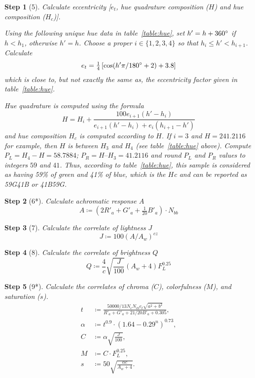 \documentclass[twocolumn]{scrartcl}
\theoremstyle{named}
\newtheorem*{step}{Step}
\begin{document}
\begin{step}[5]
Calculate eccentricity [$e_t$, hue quadrature composition
($H$) and hue composition ($H_c$)].

Using the following unique hue data in table~\ref{table:hue}, set
$h'= h + 360\degree$ if $h < h_1$, otherwise $h'=h$.
Choose a proper $i\in\{1,2,3,4\}$ so that $h_i\le h' < h_{i+1}$.
Calculate
\[
  e_t = \tfrac{1}{4}
  \left[
    \cos(h'\pi/180\degree + 2) + 3.8
  \right]
\]
which is close to, but not exactly the same as, the eccentricity factor given
in table~\ref{table:hue}.

Hue quadrature is computed using the formula
\[
  H = H_i + \frac{100 e_{i+1} (h'-h_i)}{e_{i+1}(h'-h_i) + e_i (h_{i+1}-h')}
\]
and hue composition $H_c$ is computed according to $H$.  If $i=3$ and $H =
241.2116$ for example, then $H$ is between $H_3$ and $H_4$ (see
table~\ref{table:hue} above). Compute $P_L=H_4-H = 58.7884$; $P_R = H – H_3 =
41.2116$ and round $P_L$ and $P_R$ values to integers $59$ and $41$. Thus,
according to table~\ref{table:hue}, this sample is considered as having 59\%
of green and 41\% of blue, which is the $H$c and can be reported as 59G41B or
41B59G.
\end{step}

\begin{step}[6*]
Calculate achromatic response $A$
\[
  A\coloneqq (2 R'_a + G'_a + \tfrac{1}{20} B'_a) \cdot N_{bb}
  \]
\end{step}

\begin{step}[7]
Calculate the correlate of lightness $J$
\[
  J \coloneqq 100 {(A / A_w)}^{cz}
  \]
\end{step}

\begin{step}[8]
  Calculate the correlate of brightness $Q$
  \[
    Q \coloneqq \frac{4}{c} \sqrt{\frac{J}{100}} (A_w+4) F_L^{0.25}
    \]
\end{step}

\begin{step}[9*]
Calculate the correlates of chroma ($C$), colorfulness ($M$), and saturation
  ($s$).
\begin{align*}
  t&\coloneqq \frac{50000/13 N_c N_{cb} e_t \sqrt{a^2 + b^2}}{R'_a + G'_a + 21/20 B'_a + 0.305},\\
  \alpha&\coloneqq t^{0.9} \cdot {(1.64 - 0.29^n)}^{0.73},\\
  C&\coloneqq \alpha \sqrt{\frac{J}{100}},\\
  M&\coloneqq C\cdot F_L^{0.25},\\
  s &\coloneqq 50 \sqrt{\frac{\alpha c}{A_w + 4}}.
\end{align*}
\end{step}
\end{document}
